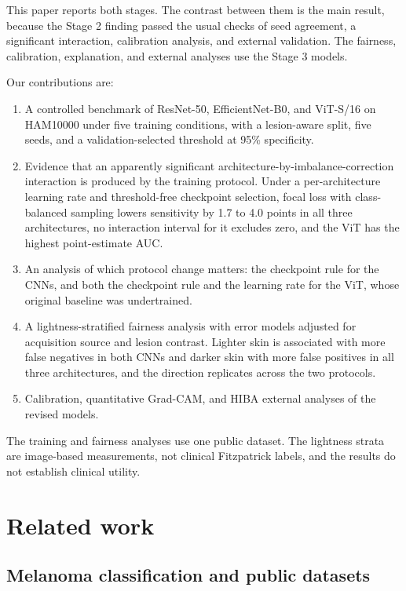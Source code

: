 \documentclass[11pt]{article}
\begin{document}
This paper reports both stages. The contrast between them is the main result, because the Stage 2 finding passed the usual checks of seed agreement, a significant interaction, calibration analysis, and external validation. The fairness, calibration, explanation, and external analyses use the Stage 3 models.

Our contributions are:

\begin{enumerate}
  \item A controlled benchmark of ResNet-50, EfficientNet-B0, and ViT-S/16 on HAM10000 under five training conditions, with a lesion-aware split, five seeds, and a validation-selected threshold at 95\% specificity.
  \item Evidence that an apparently significant architecture-by-imbalance-correction interaction is produced by the training protocol. Under a per-architecture learning rate and threshold-free checkpoint selection, focal loss with class-balanced sampling lowers sensitivity by 1.7 to 4.0 points in all three architectures, no interaction interval for it excludes zero, and the ViT has the highest point-estimate AUC.
  \item An analysis of which protocol change matters: the checkpoint rule for the CNNs, and both the checkpoint rule and the learning rate for the ViT, whose original baseline was undertrained.
  \item A lightness-stratified fairness analysis with error models adjusted for acquisition source and lesion contrast. Lighter skin is associated with more false negatives in both CNNs and darker skin with more false positives in all three architectures, and the direction replicates across the two protocols.
  \item Calibration, quantitative Grad-CAM, and HIBA external analyses of the revised models.
\end{enumerate}

The training and fairness analyses use one public dataset. The lightness strata are image-based measurements, not clinical Fitzpatrick labels, and the results do not establish clinical utility.

\section{Related work}

\subsection{Melanoma classification and public datasets}
\end{document}
